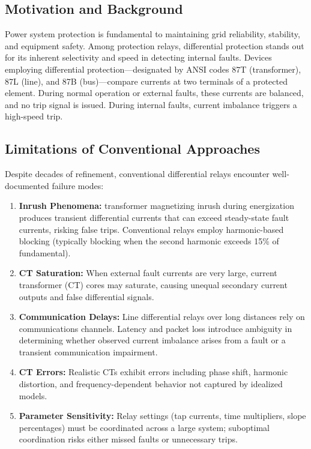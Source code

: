 \documentclass[12pt,a4paper]{article}
\begin{document}
\subsection{Motivation and Background}
\label{subsec:motivation}

Power system protection is fundamental to maintaining grid reliability, stability, 
and equipment safety. Among protection relays, differential protection stands out for 
its inherent selectivity and speed in detecting internal faults. Devices employing 
differential protection—designated by ANSI codes 87T (transformer), 87L (line), and 
87B (bus)—compare currents at two terminals of a protected element. During normal 
operation or external faults, these currents are balanced, and no trip signal is issued. 
During internal faults, current imbalance triggers a high-speed trip.

\subsection{Limitations of Conventional Approaches}
\label{subsec:limitations}

Despite decades of refinement, conventional differential relays encounter well-documented 
failure modes:

\begin{enumerate}
    \item \textbf{Inrush Phenomena:} transformer magnetizing inrush during energization 
    produces transient differential currents that can exceed steady-state fault currents, 
    risking false trips. Conventional relays employ harmonic-based blocking (typically 
    blocking when the second harmonic exceeds 15\% of fundamental).
    
    \item \textbf{CT Saturation:} When external fault currents are very large, current 
    transformer (CT) cores may saturate, causing unequal secondary current outputs and 
    false differential signals.
    
    \item \textbf{Communication Delays:} Line differential relays over long distances 
    rely on communications channels. Latency and packet loss introduce ambiguity in 
    determining whether observed current imbalance arises from a fault or a transient 
    communication impairment.
    
    \item \textbf{CT Errors:} Realistic CTs exhibit errors including phase shift, 
    harmonic distortion, and frequency-dependent behavior not captured by idealized models.
    
    \item \textbf{Parameter Sensitivity:} Relay settings (tap currents, time multipliers, 
    slope percentages) must be coordinated across a large system; suboptimal coordination 
    risks either missed faults or unnecessary trips.
\end{enumerate}
\end{document}
